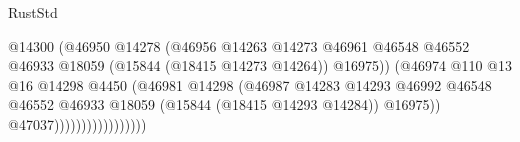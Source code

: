 \begin{lexlean}{RustStd}
\begin{coremodule}
                                                                  @14300
                                                                  (@46950
                                                                    @14278
                                                                    (@46956
                                                                      @14263
                                                                      @14273
                                                                      @46961
                                                                      @46548
                                                                      @46552
                                                                      @46933
                                                                      @18059
                                                                      (@15844
                                                                        (@18415 @14273 @14264))
                                                                      @16975))
                                                                  (@46974
                                                                    @110
                                                                    @13
                                                                    @16
                                                                    @14298
                                                                    @4450
                                                                    (@46981
                                                                      @14298
                                                                      (@46987
                                                                        @14283
                                                                        @14293
                                                                        @46992
                                                                        @46548
                                                                        @46552
                                                                        @46933
                                                                        @18059
                                                                        (@15844
                                                                          (@18415 @14293 @14284))
                                                                        @16975))
                                                                    @47037)))))))))))))))))

\end{coremodule}
\end{lexlean}
